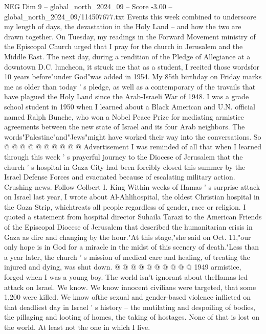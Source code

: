 \begin{textsample}{NEG Dim 9 – global\_north\_2024\_09 – Score -3.00 – global\_north\_2024\_09/114507677.txt}  \label{ex:f9_neg_207}
Events this week combined to underscore my length of days, the devastation in the Holy Land -- and how the two are drawn together.
On Tuesday, my readings in the Forward Movement ministry of the Episcopal Church urged that I pray for the church in Jerusalem and the Middle East.
The next day, during a rendition of the Pledge of Allegiance at a downtown D.C. luncheon, it struck me that as a student, I recited those wordsfor 10 years before"under God"was added in 1954.
My 85th birthday on Friday marks me as older than today ' s pledge, as well as a contemporary of the travails that have plagued the Holy Land since the Arab-Israeli War of 1948.
I was a grade school student in 1950 when I learned about a Black American and U.N. official named Ralph Bunche, who won a Nobel Peace Prize for mediating armistice agreements between the new state of Israel and its four Arab neighbors.
The words"Palestine"and"Jews"might have worked their way into the conversations.
So @ @ @ @ @ @ @ @ @ @ Advertisement I was reminded of all that when I learned through this week ' s prayerful journey to the Diocese of Jerusalem that the church ' s hospital in Gaza City had been forcibly closed this summer by the Israel Defense Forces and evacuated because of escalating military action.
Crushing news.
Follow Colbert I.
King Within weeks of Hamas ' s surprise attack on Israel last year, I wrote about Al-Ahlihospital, the oldest Christian hospital in the Gaza Strip, whichtreats all people regardless of gender, race or religion.
I quoted a statement from hospital director Suhaila Tarazi to the American Friends of the Episcopal Diocese of Jerusalem that described the humanitarian crisis in Gaza as dire and changing by the hour."At this stage,"she said on Oct. 11,"our only hope is in God for a miracle in the midst of this scenery of death."Less than a year later, the church ' s mission of medical care and healing, of treating the injured and dying, was shut down. @ @ @ @ @ @ @ @ @ @ 1949 armistice, forged when I was a young boy.
The world isn't ignorant about theHamas-led attack on Israel.
We know.
We know innocent civilians were targeted, that some 1,200 were killed.
We know ofthe sexual and gender-based violence inflicted on that deadliest day in Israel ' s history -- the mutilating and despoiling of bodies, the pillaging and looting of homes, the taking of hostages.
None of that is lost on the world.
At least not the one in which I live.

\end{textsample}

